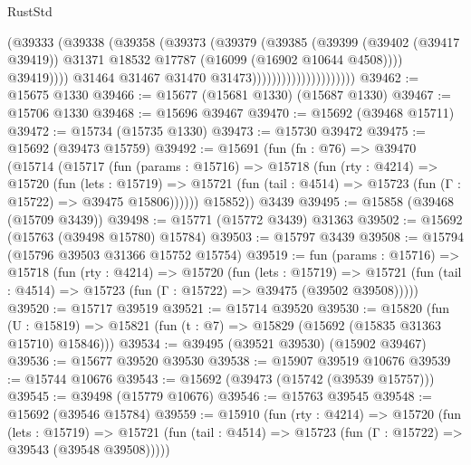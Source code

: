 \begin{lexlean}{RustStd}
\begin{coremodule}
                                            (@39333
                                              (@39338
                                                (@39358
                                                  (@39373
                                                    (@39379
                                                      (@39385
                                                        (@39399
                                                          (@39402 (@39417 @39419))
                                                          @31371
                                                          @18532
                                                          @17787
                                                          (@16099 (@16902 @10644 @4508))))
                                                      @39419))))
                                              @31464
                                              @31467
                                              @31470
                                              @31473)))))))))))))))))))))
@39462 := @15675 @1330
@39466 := @15677 (@15681 @1330) (@15687 @1330)
@39467 := @15706 @1330
@39468 := @15696 @39467
@39470 := @15692 (@39468 @15711)
@39472 := @15734 (@15735 @1330)
@39473 := @15730 @39472
@39475 := @15692 (@39473 @15759)
@39492 := @15691
    (fun (fn : @76) =>
    @39470
      (@15714
        (@15717
          (fun (params : @15716) =>
          @15718
            (fun (rty : @4214) =>
            @15720
              (fun (lets : @15719) =>
              @15721 (fun (tail : @4514) => @15723 (fun (Γ : @15722) => @39475 @15806))))))
        @15852))
    @3439
@39495 := @15858 (@39468 (@15709 @3439))
@39498 := @15771 (@15772 @3439) @31363
@39502 := @15692 (@15763 (@39498 @15780) @15784)
@39503 := @15797 @3439
@39508 := @15794 (@15796 @39503 @31366 @15752 @15754)
@39519 := fun (params : @15716) =>
  @15718
    (fun (rty : @4214) =>
    @15720
      (fun (lets : @15719) =>
      @15721 (fun (tail : @4514) => @15723 (fun (Γ : @15722) => @39475 (@39502 @39508)))))
@39520 := @15717 @39519
@39521 := @15714 @39520
@39530 := @15820
    (fun (U : @15819) => @15821 (fun (t : @7) => @15829 (@15692 (@15835 @31363 @15710) @15846)))
@39534 := @39495 (@39521 @39530) (@15902 @39467)
@39536 := @15677 @39520 @39530
@39538 := @15907 @39519 @10676
@39539 := @15744 @10676
@39543 := @15692 (@39473 (@15742 (@39539 @15757)))
@39545 := @39498 (@15779 @10676)
@39546 := @15763 @39545
@39548 := @15692 (@39546 @15784)
@39559 := @15910
    (fun (rty : @4214) =>
    @15720
      (fun (lets : @15719) =>
      @15721 (fun (tail : @4514) => @15723 (fun (Γ : @15722) => @39543 (@39548 @39508)))))

\end{coremodule}
\end{lexlean}
